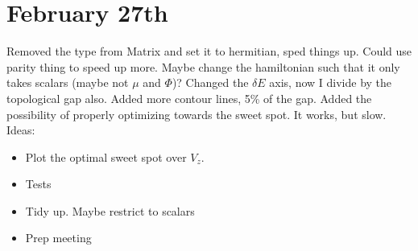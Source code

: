 \documentclass{article}
\begin{document}
\section*{February 27th}
Removed the type from Matrix and set it to hermitian, sped things up. Could use parity thing to speed up more. Maybe change the hamiltonian such that it only takes scalars (maybe not $\mu$ and $\Phi$)? Changed the $\delta E$ axis, now I divide by the topological gap also. Added more contour lines, 5\% of the gap. Added the possibility of properly optimizing towards the sweet spot. It works, but slow. Ideas: 
\begin{itemize}
    \item Plot the optimal sweet spot over $V_z$.
    \item Tests
    \item Tidy up. Maybe restrict to scalars
    \item Prep meeting
\end{itemize}
\end{document}
